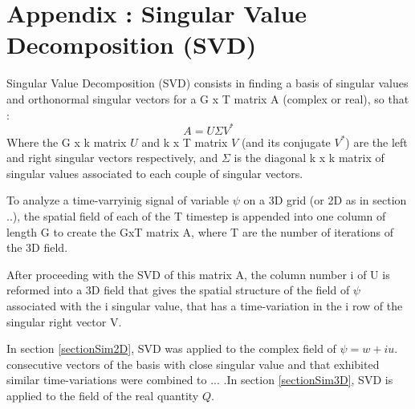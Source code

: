 \section{Appendix : Singular Value Decomposition (SVD)}
\label{annexeSVD}
Singular Value Decomposition (SVD) consists in finding a basis of singular values and orthonormal singular vectors for a G x T matrix A (complex or real), so that :
\begin{equation}
A = U \Sigma V^* 
\end{equation}
Where the G x k matrix $U$ and k x T matrix $V$ (and its conjugate $V^*$) are the left and right singular vectors respectively, and $\Sigma$ is the diagonal k x k matrix of singular values associated to each couple of singular vectors.

To analyze a time-varryinig signal of variable $\psi$ on a 3D grid (or 2D as in section ..), the spatial field of each of the T timestep is appended into one column of length G to create the GxT matrix A, where T are the number of iterations of the 3D field. 

After proceeding with the SVD of this matrix A, the column number i of U is reformed into a 3D field that gives the spatial structure of the field of $\psi$ associated with the i singular value, that has a time-variation in the i row of the singular right vector V.

In section \ref{sectionSim2D}, SVD was applied to the complex field of $\psi=w+iu$. consecutive vectors of the basis with close singular value and that exhibited similar time-variations were combined to ... .In section \ref{sectionSim3D}, SVD is applied to the field of the real quantity $Q$.
